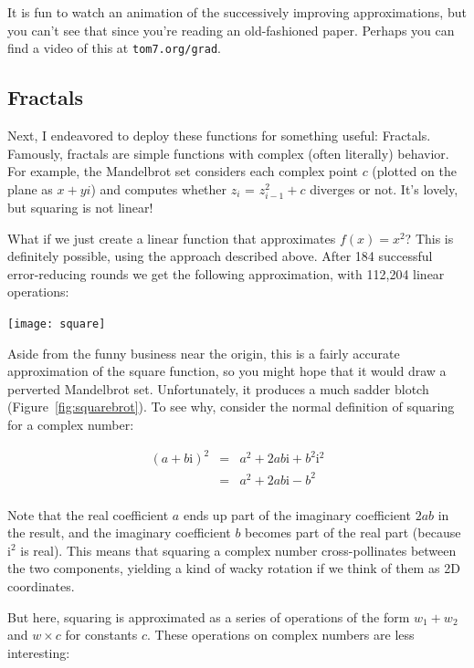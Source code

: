\documentclass[twocolumn]{article}
\begin{document}
It is fun to watch an animation of the successively improving
approximations, but you can't see that since you're reading an
old-fashioned paper. Perhaps you can find a video of this at
\verb+tom7.org/grad+.

\subsection{Fractals} \label{sec:fractals}
Next, I endeavored to deploy these functions for something useful:
Fractals. Famously, fractals are simple functions with complex (often
literally) behavior. For example, the Mandelbrot set considers each
complex point $c$ (plotted on the plane as $x + yi$) and computes
whether $z_i$ = $z_{i-1}^2 + c$ diverges or not. It's lovely, but
squaring is not linear!

What if we just create a linear function that approximates $f(x) = x^2$?
This is definitely possible, using the approach described above. After
184 successful error-reducing rounds we get the following approximation,
with 112,204 linear operations:

\begin{center}
\texttt{[image: square]}
\end{center}

Aside from the funny business near the origin, this is a fairly
accurate approximation of the square function, so you might hope that
it would draw a perverted Mandelbrot set. Unfortunately, it produces
a much sadder blotch (Figure~\ref{fig:squarebrot}). To see why, consider
the normal definition of squaring for a complex number:

\[
\begin{array}{rcl}
  (a + b\mathrm{i})^2 & = & a^2 + 2ab\mathrm{i} + b^2\mathrm{i}^2 \\
                      & = & a^2 + 2ab\mathrm{i} - b^2 \\
\end{array}
\]

Note that the real coefficient $a$ ends up part of the imaginary
coefficient $2ab$ in the result, and the imaginary coefficient $b$
becomes part of the real part (because $\mathrm{i}^2$ is real). This
means that squaring a complex number cross-pollinates between the two
components, yielding a kind of wacky rotation if we think of them as
2D coordinates.

But here, squaring is approximated as a series of operations
of the form $w_1 + w_2$ and $w \times c$ for constants $c$.
These operations on complex numbers are less interesting:
\end{document}
